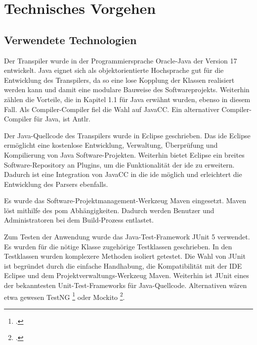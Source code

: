 \section{Technisches Vorgehen}
\subsection{Verwendete Technologien}

Der Transpiler wurde in der Programmiersprache Oracle-Java der Version 17 entwickelt. 
Java eignet sich als objektorientierte Hochsprache gut für die Entwicklung des Transpilers, da so eine lose Kopplung der Klassen realisiert werden kann und damit eine modulare Bauweise des Softwareprojekts.
Weiterhin zählen die Vorteile, die in Kapitel 1.1 für Java erwähnt wurden, ebenso in diesem Fall.  
Als Compiler-Compiler fiel die Wahl auf JavaCC. Ein alternativer Compiler-Compiler für Java, ist Antlr. 

Der Java-Quellcode des Transpilers wurde in Eclipse geschrieben. Das \ac{ide} Eclipse ermöglicht eine kostenlose Entwicklung, Verwaltung, Überprüfung und Kompilierung von Java Software-Projekten. Weiterhin bietet Eclipse ein breites Software-Repository an Plugins, um die Funktionalität der  \ac{ide} zu erweitern. Dadurch ist eine Integration von JavaCC in die  \ac{ide} möglich und erleichtert die Entwicklung des Parsers ebenfalls.

Es wurde das Software-Projektmanagement-Werkzeug Maven eingesetzt. Maven löst mithilfe des \ac{pom} Abhängigkeiten. 
Dadurch werden Benutzer und Administratoren bei dem Build-Prozess entlastet.

Zum Testen der Anwendung wurde das Java-Test-Framework JUnit 5 verwendet. Es wurden für die nötige Klasse zugehörige Testklassen geschrieben. In den Testklassen wurden komplexere Methoden isoliert getestet.
Die Wahl von JUnit ist begründet durch die einfache Handhabung, die Kompatibilität mit der IDE Eclipse und dem Projektverwaltungs-Werkzeug Maven. Weiterhin ist JUnit eines der bekanntesten Unit-Test-Frameworks für Java-Quellcode. Alternativen wären etwa gewesen TestNG \footcite[Vgl. ][]{testng} oder Mockito \footcite[Vgl. ][]{mockito}.

